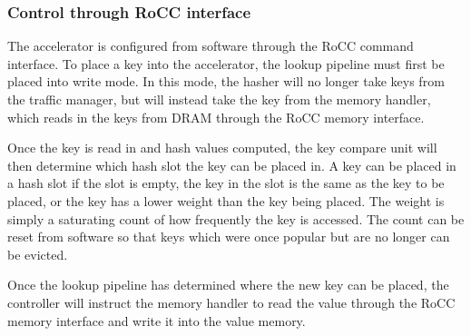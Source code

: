 \subsubsection{Control through RoCC interface}

The accelerator is configured from software through the RoCC command interface.
To place a key into the accelerator, the lookup pipeline must first be
placed into write mode. In this mode, the hasher will no longer take keys
from the traffic manager, but will instead take the key from the memory handler,
which reads in the keys from DRAM through the RoCC memory interface.

Once the key is read in and hash values computed, the key compare unit will
then determine which hash slot the key can be placed in. A key can be placed
in a hash slot if the slot is empty, the key in the slot is the same as the
key to be placed, or the key has a lower weight than the key being placed.
The weight is simply a saturating count of how frequently the key is accessed.
The count can be reset from software so that keys which were once popular but
are no longer can be evicted.

Once the lookup pipeline has determined where the new key can be placed, the
controller will instruct the memory handler to read the value through the
RoCC memory interface and write it into the value memory.

